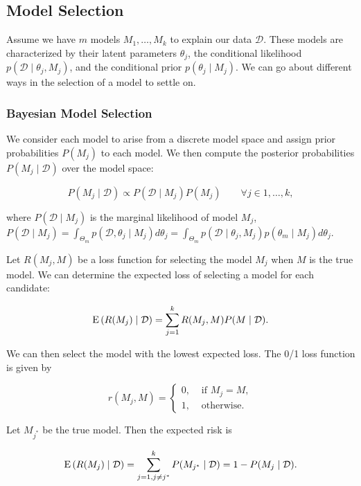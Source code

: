 \subsection{Model Selection}

Assume we have $m$ models $M_1,\dots,M_k$ to explain our data $\mathcal{D}$. These models are characterized by their latent parameters $\theta_j$, the conditional likelihood $p(\mathcal{D}\mid\theta_j,M_j)$, and the conditional prior $p(\theta_j\mid M_j)$. We can go about different ways in the selection of a model to settle on.

\subsubsection{Bayesian Model Selection}

We consider each model to arise from a discrete model space and assign prior probabilities $P(M_j)$ to each model. We then compute the posterior probabilities $P(M_j\mid\mathcal{D})$ over the model space:

\begin{equation}
	P(M_j\mid\mathcal{D}) \propto P(\mathcal{D}\mid M_j)P(M_j) \qquad \forall j \in 1,\dots, k,
\end{equation}

where $P(\mathcal{D}\mid M_j)$ is the marginal likelihood of model $M_j$, $P(\mathcal{D}\mid M_j) = \int_{\Theta_m}p(\mathcal{D},\theta_j\mid M_j)d\theta_j = \int_{\Theta_m}p(\mathcal{D}\mid\theta_j,M_j)p(\theta_m\mid M_j)d\theta_j$.

Let $R(M_j,M)$ be a loss function for selecting the model $M_j$ when $M$ is the true model. We can determine the expected loss of selecting a model for each candidate:

\begin{equation}
	\mathrm{E}\left({R(M_j)\mid \mathcal{D}}\right) = \sum^k_{j = 1}R(M_j,M)P(M\mid \mathcal{D}).
\end{equation}

We can then select the model with the lowest expected loss. The 0/1 loss function is given by

\[
	r(M_j,M) = 
	\begin{cases}
		0, &\text{ if }M_j = M, \\
		1, & \text{ otherwise.}
	\end{cases}
\]

Let $M_{j^*}$ be the true model. Then the expected risk is 

\[
	\mathrm{E}\left({R(M_j) \mid \mathcal{D}}\right) = \sum^k_{j = 1,j \neq j^*}P(M_{j^*}\mid \mathcal{D}) = 1 - P(M_j\mid \mathcal{D}).
\]

